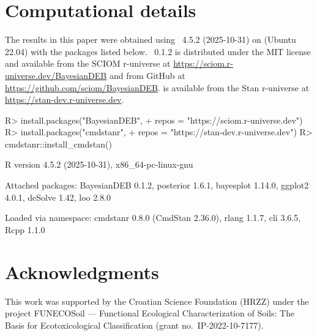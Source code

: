 \documentclass[article,shortnames]{jss}
\begin{document}
\section*{Computational details}

The results in this paper were obtained using
~4.5.2 (2025-10-31) on 
(Ubuntu 22.04) with the packages listed below.
~0.1.2 is distributed under the MIT license and
available from the SCIOM r-universe at
\url{https://sciom.r-universe.dev/BayesianDEB} and from GitHub at
\url{https://github.com/sciom/BayesianDEB}.   is
available from the Stan r-universe at
\url{https://stan-dev.r-universe.dev}.

\begin{CodeChunk}
\begin{CodeInput}
R> install.packages("BayesianDEB",
+    repos = "https://sciom.r-universe.dev")
R> install.packages("cmdstanr",
+    repos = "https://stan-dev.r-universe.dev")
R> cmdstanr::install_cmdstan()
\end{CodeInput}
\end{CodeChunk}

\begin{CodeChunk}
\begin{CodeOutput}
R version 4.5.2 (2025-10-31), x86_64-pc-linux-gnu

Attached packages:
  BayesianDEB 0.1.2, posterior 1.6.1, bayesplot 1.14.0,
  ggplot2 4.0.1, deSolve 1.42, loo 2.8.0

Loaded via namespace:
  cmdstanr 0.8.0 (CmdStan 2.36.0), rlang 1.1.7,
  cli 3.6.5, Rcpp 1.1.0
\end{CodeOutput}
\end{CodeChunk}


\section*{Acknowledgments}

This work was supported by the Croatian Science Foundation (HRZZ)
under the project FUNECOSoil --- Functional Ecological
Characterization of Soils: The Basis for Ecotoxicological
Classification (grant no.\ IP-2022-10-7177).



\end{document}
